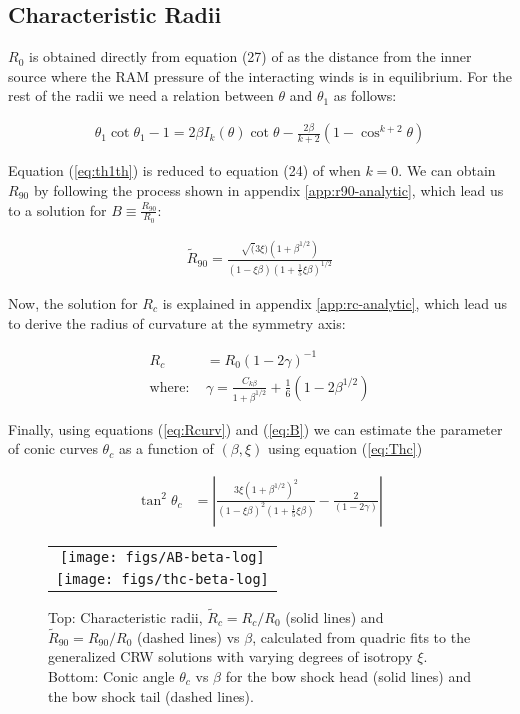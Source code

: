 \subsection{Characteristic Radii}
$R_0$ is obtained directly from equation (27) of \CRW{} as the distance from the inner source where the RAM pressure of the interacting winds is in equilibrium.
For the rest of the radii we need a relation between $\theta$ and $\theta_1$ as follows:


\begin{align}
\theta_1\cot\theta_1 -1 = 2\beta I_k(\theta) \cot\theta - \frac{2\beta}{k+2}\left(1-\cos^{k+2}\theta\right)
\label{eq:th1th}
\end{align}

Equation (\ref{eq:th1th}) is reduced to equation (24) of \CRW{} when $k=0$.
We can obtain $R_{90}$ by following the process shown in appendix \ref{app:r90-analytic},
which lead us to a solution for $B \equiv \frac{R_{90}}{R_0}$:

\begin{align}
\tilde{R}_{90} = \frac{\sqrt(3\xi)\left(1+\beta^{1/2}\right)}{(1-\xi\beta)\left(1+\frac{1}{5}\xi\beta\right)^{1/2}}
\label{eq:B}
\end{align}

Now, the solution for $R_c$ is explained in appendix \ref{app:rc-analytic},
which lead us to derive the radius of curvature at the symmetry axis:

\begin{align}
R_c &= R_0\left(1-2\gamma\right)^{-1} \label{eq:Rcurv} \\
\mathrm{where:~} & \gamma = \frac{C_{k\beta}}{1+\beta^{1/2}}+\frac{1}{6}(1-2\beta^{1/2})
\end{align}

Finally, using equations (\ref{eq:Rcurv}) and (\ref{eq:B}) we can estimate the parameter of
conic curves $\theta_c$ as a function of $(\beta,\xi)$ using equation (\ref{eq:Thc})

\begin{align}
\tan^2\theta_c &= \left| \frac{3\xi\left(1+\beta^{1/2}\right)^2}{\left(1-\xi\beta\right)^2\left(1+\frac{1}{5}\xi\beta\right)}-\frac{2}{\left(1-2\gamma\right)}\right| 
\label{eq:thc-CRW}
\end{align}

\begin{figure}
\begin{tabular}{c}
\texttt{[image: figs/AB-beta-log]} \\
\texttt{[image: figs/thc-beta-log]}
\end{tabular}
\caption{Top: Characteristic radii, $\tilde{R}_c = R_c/R_0$ (solid lines) and $\tilde{R}_{90}
  = R_{90}/R_0$ (dashed lines)
  vs $\beta$, calculated from quadric fits to the generalized CRW
  solutions with varying degrees of isotropy $\xi$.  Bottom: Conic
  angle $\theta_c$ vs $\beta$ for the bow 
  shock head (solid lines) and the bow shock tail (dashed lines).}
\label{fig:rad-beta}
\end{figure}


